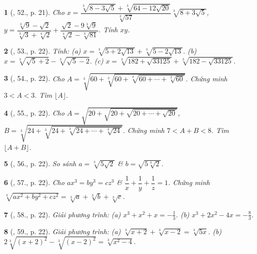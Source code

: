 \documentclass{article}
\newtheorem{baitoan}{}%
\begin{document}
\begin{baitoan}[\cite{Tuyen_Toan_9_old}, 52., p. 21]
	Cho $x = \dfrac{\sqrt[3]{8 - 3\sqrt{5}} + \sqrt[3]{64 - 12\sqrt{20}}}{\sqrt[3]{57}}\sqrt[3]{8 + 3\sqrt{5}}$, $y = \dfrac{\sqrt[3]{9} - \sqrt{2}}{\sqrt[3]{3} + \sqrt[4]{2}} + \dfrac{\sqrt{2} - 9\sqrt[3]{9}}{\sqrt[4]{2} - \sqrt[3]{81}}$. Tính $xy$.
\end{baitoan}

\begin{baitoan}[\cite{Tuyen_Toan_9_old}, 53., p. 22]
	Tính: (a) $x = \sqrt[3]{5 + 2\sqrt{13}} + \sqrt[3]{5 - 2\sqrt{13}}$. (b) $x = \sqrt[3]{\sqrt{5} + 2} - \sqrt[3]{\sqrt{5} - 2}$. (c) $x = \sqrt[3]{182 + \sqrt{33125}} + \sqrt[3]{182 - \sqrt{33125}}$.
\end{baitoan}

\begin{baitoan}[\cite{Tuyen_Toan_9_old}, 54., p. 22]
	Cho $A = \sqrt[3]{60 + \sqrt[3]{60 + \sqrt[3]{60 + \cdots + \sqrt[3]{60}}}}$. Chứng minh $3 < A < 3$. Tìm $\lfloor A\rfloor$.
\end{baitoan}

\begin{baitoan}[\cite{Tuyen_Toan_9_old}, 55., p. 22]
	Cho $A = \sqrt{20 + \sqrt{20 + \sqrt{20 + \cdots + \sqrt{20}}}}$, $B = \sqrt[3]{24 + \sqrt[3]{24 + \sqrt[3]{24 + \cdots + \sqrt[3]{24}}}}$. Chứng minh $7 < A + B < 8$. Tìm $\lfloor A + B\rfloor$.
\end{baitoan}

\begin{baitoan}[\cite{Tuyen_Toan_9_old}, 56., p. 22]
	So sánh $a = \sqrt[3]{5\sqrt{2}}$ \& $b = \sqrt{5\sqrt[3]{2}}$.
\end{baitoan}

\begin{baitoan}[\cite{Tuyen_Toan_9_old}, 57., p. 22]
	Cho $ax^3 = by^3 = cz^3$ \& $\dfrac{1}{x} + \dfrac{1}{y} + \dfrac{1}{z} = 1$. Chứng minh $\sqrt[3]{ax^2 + by^2 + cz^2} = \sqrt[3]{a} + \sqrt[3]{b} + \sqrt[3]{c}$.	
\end{baitoan}

\begin{baitoan}[\cite{Tuyen_Toan_9_old}, 58., p. 22]
	Giải phương trình: (a) $x^3 + x^2 + x = -\frac{1}{3}$. (b) $x^3 + 2x^2 - 4x = -\frac{8}{3}$.
\end{baitoan}

\begin{baitoan}[\cite{Tuyen_Toan_9_old}, 59., p. 22]
	Giải phương trình: (a) $\sqrt[3]{x + 2} + \sqrt[3]{x - 2} = \sqrt[3]{5x}$. (b) $2\sqrt[3]{(x + 2)^2} - \sqrt[3]{(x - 2)^2} = \sqrt[3]{x^2 - 4}$.
\end{baitoan}
\end{document}
